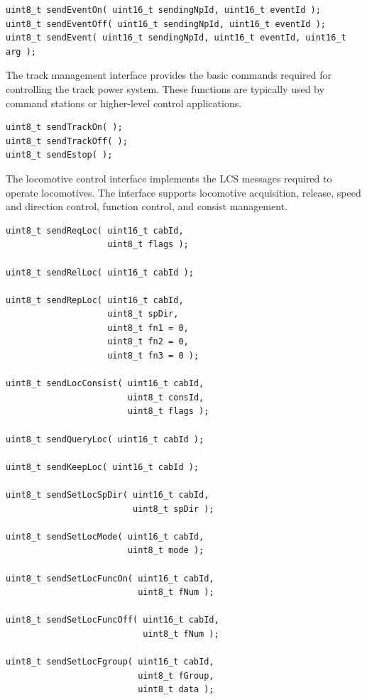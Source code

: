\begin{lstlisting}[style=api-interface]
uint8_t sendEventOn( uint16_t sendingNpId, uint16_t eventId );
uint8_t sendEventOff( uint16_t sendingNpId, uint16_t eventId );
uint8_t sendEvent( uint16_t sendingNpId, uint16_t eventId, uint16_t arg );
\end{lstlisting}


The track management interface provides the basic commands required for controlling 
the track power system. These functions are typically used by command stations 
or higher-level control applications.

\begin{lstlisting}[style=api-interface]
uint8_t sendTrackOn( );
uint8_t sendTrackOff( );
uint8_t sendEstop( );
\end{lstlisting}


The locomotive control interface implements the LCS messages required to operate 
locomotives. The interface supports locomotive acquisition, release, speed and 
direction control, function control, and consist management.

\begin{lstlisting}[style=api-interface]
uint8_t sendReqLoc( uint16_t cabId,
                    uint8_t flags );

uint8_t sendRelLoc( uint16_t cabId );

uint8_t sendRepLoc( uint16_t cabId,
                    uint8_t spDir,
                    uint8_t fn1 = 0,
                    uint8_t fn2 = 0,
                    uint8_t fn3 = 0 );

uint8_t sendLocConsist( uint16_t cabId,
                        uint8_t consId,
                        uint8_t flags );

uint8_t sendQueryLoc( uint16_t cabId );

uint8_t sendKeepLoc( uint16_t cabId );

uint8_t sendSetLocSpDir( uint16_t cabId,
                         uint8_t spDir );

uint8_t sendSetLocMode( uint16_t cabId,
                        uint8_t mode );

uint8_t sendSetLocFuncOn( uint16_t cabId,
                          uint8_t fNum );

uint8_t sendSetLocFuncOff( uint16_t cabId,
                           uint8_t fNum );

uint8_t sendSetLocFgroup( uint16_t cabId,
                          uint8_t fGroup,
                          uint8_t data );
\end{lstlisting}

